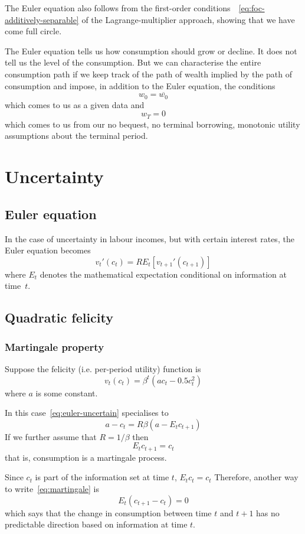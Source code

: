 \documentclass[12pt,reqno]{amsart}
\begin{document}
The Euler equation also follows from the first-order
conditions~~\eqref{eq:foc-additively-separable} of the Lagrange-multiplier
approach, showing that we have
come full circle.

The Euler equation tells us how consumption should grow or decline. It
does not tell us the level of the consumption. But we can characterise
the entire consumption path if we keep track of
the path of wealth implied by the path of consumption and impose, in
addition to the Euler equation, the
conditions
\[w_0 = \overline{w_0}\]
which comes to us as a given data and 
\[w_T=0\]
which comes to us from our no bequest, no terminal borrowing,
monotonic utility assumptions about the terminal period.

\section{Uncertainty}
\subsection{Euler equation}
In the case of uncertainty in labour incomes, but with certain
interest rates, the Euler equation becomes
\begin{equation}\label{eq:euler-uncertain}
v_t'(c_t)=RE_t[v_{t+1}'(c_{t+1})]
\end{equation}
where $E_t$ denotes the mathematical expectation conditional on information at time~$t$.

\subsection{Quadratic felicity}
\subsubsection{Martingale property}
Suppose the felicity (i.e. per-period utility) function is
\[v_t(c_t)=\beta^t(ac_t-0.5c_t^2)\]
where $a$ is some constant.

In this case~\eqref{eq:euler-uncertain} specialises to
\[a-c_t = R\beta(a- E_t c_{t+1})\]
If we further assume that $R=1/\beta$ then
\begin{equation}\label{eq:martingale}
E_t c_{t+1}=c_t
\end{equation}
that is, consumption is a martingale process. 

Since $c_t$ is part of the information set at time $t$, $E_tc_t=c_t$
Therefore, another way to write~\eqref{eq:martingale} is
\[E_t(c_{t+1}-c_t)=0\]
which says that the change in consumption between time $t$ and $t+1$
has no predictable direction based on information at time $t$.
\end{document}
